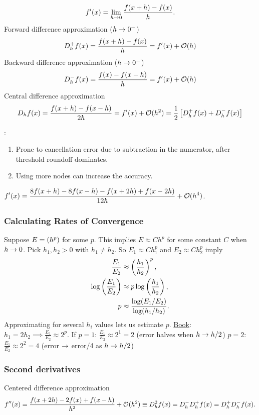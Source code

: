 \documentclass[]{article}
\begin{document}
$$ f'(x) = \lim_{h\rightarrow0} \frac{f(x+h)-f(x)}h.$$
Forward difference approximation ($h\rightarrow0^+$)
$$ D_h^+f(x) = \frac{f(x+h)-f(x)}h = f'(x) + \mathcal{O}(h)$$
Backward difference approximation ($h\rightarrow0^-$)
$$ D_h^- f(x) = \frac{f(x)-f(x-h)}h = f'(x) + \mathcal{O}(h)$$
Central difference approximation
$$D_hf(x) = \frac{f(x+h)-f(x-h)}{2h} = f'(x) + \mathcal{O}(h^2) = \frac12 \left[D_h^+f(x) + D_h^-f(x)\right] $$
\begin{note}:
	\begin{enumerate}
		\item Prone to cancellation error due to subtraction in the numerator, after threshold roundoff dominates.
		\item Using more nodes can increase the accuracy.
	\end{enumerate}
\end{note}
\begin{example}
	$\displaystyle f'(x) = \frac{8f(x+h)-8f(x-h)-f(x+2h) + f(x-2h)}{12h} + \mathcal{O}(h^4)$.
\end{example}

\subsubsection*{Calculating Rates of Convergence}

Suppose $E = \mathcal{(}h^p)$ for some $p$. This implies $E\approx Ch^p$ for some constant $C$ when $h\rightarrow0$.
Pick $h_1,h_2>0$ with $h_1\neq h_2$.
So $E_1\approx Ch_1^p$ and $E_2\approx Ch_2^p$ imply
\begin{align*}
	\frac{E_1}{E_2} &\approx \plr{\frac{h_1}{h_2}}^p, \\ %
	\log\plr{\frac{E_1}{E_2}} &\approx p\log\plr{\frac{h_1}{h_2}}, \\%
	p &\approx \frac{\log(E_1/E_2)}{\log(h_1/h_2)}.
\end{align*}
Approximating for several $h_i$ values lets us estimate $p$.
\ul{Book}: $h_1=2h_2 \implies \frac{E_1}{E_2} \approx 2^p$.
If $p=1$: $\frac{E_1}{E_2} \approx 2^1 = 2$ (error halves when $h\rightarrow h/2$)
$p=2$: $\frac{E_1}{E_2} \approx 2^2 = 4$ (error $\rightarrow$ error/4 as $h\rightarrow h/2$)

\subsubsection*{Second derivatives}

Centered difference approximation $$\displaystyle f''(x) = \frac{f(x+2h)-2f(x)+f(x-h)}{h^2} + \mathcal{O}(h^2) \equiv D_h^2 f(x) = D_h^- D_h^+ f(x) = D_h^+ D_h^- f(x).$$
\end{document}
